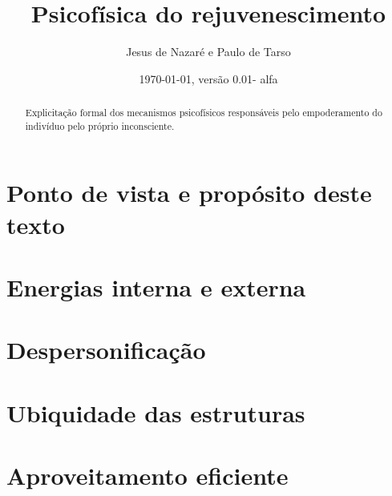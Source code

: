 \documentclass[a4paper]{article}
\title{Psicofísica do rejuvenescimento}
\author{Jesus de Nazaré e Paulo de Tarso}
\date{\today, versão 0.01- alfa}
\begin{document}
\maketitle



\begin{abstract}
Explicitação formal dos mecanismos psicofísicos responsáveis pelo empoderamento do indivíduo pelo próprio inconsciente.
\end{abstract}

\tableofcontents

\section{Ponto de vista e propósito deste texto}

\section{Energias interna e externa}
\section{Despersonificação}
\section{Ubiquidade das estruturas}
\section{Aproveitamento eficiente}
\end{document}
